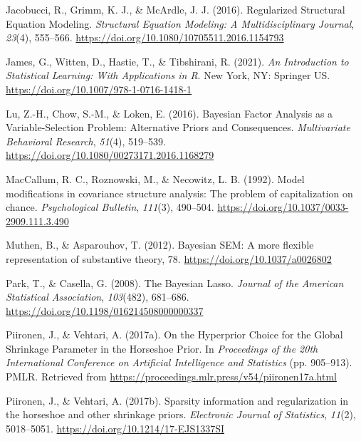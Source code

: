 \documentclass[
  man,floatsintext]{apa6}
\newlength{\cslhangindent}
\newlength{\cslentryspacingunit} %
\newenvironment{CSLReferences}[2] %
 {%
  \setlength{\parindent}{0pt}
  \ifodd #1
  \let\oldpar\par
  \def\par{\hangindent=\cslhangindent\oldpar}
  \fi
  \setlength{\parskip}{#2\cslentryspacingunit}
 }%
 {}
\begin{document}
\begin{CSLReferences}{1}{0}
\leavevmode{}%
Jacobucci, R., Grimm, K. J., \& McArdle, J. J. (2016). Regularized {Structural} {Equation} {Modeling}. \emph{Structural Equation Modeling: A Multidisciplinary Journal}, \emph{23}(4), 555--566. \url{https://doi.org/10.1080/10705511.2016.1154793}

\leavevmode{}%
James, G., Witten, D., Hastie, T., \& Tibshirani, R. (2021). \emph{An {Introduction} to {Statistical} {Learning}: With {Applications} in {R}}. New York, NY: Springer US. \url{https://doi.org/10.1007/978-1-0716-1418-1}

\leavevmode{}%
Lu, Z.-H., Chow, S.-M., \& Loken, E. (2016). Bayesian {Factor} {Analysis} as a {Variable}-{Selection} {Problem}: {Alternative} {Priors} and {Consequences}. \emph{Multivariate Behavioral Research}, \emph{51}(4), 519--539. \url{https://doi.org/10.1080/00273171.2016.1168279}

\leavevmode{}%
MacCallum, R. C., Roznowski, M., \& Necowitz, L. B. (1992). Model modifications in covariance structure analysis: The problem of capitalization on chance. \emph{Psychological Bulletin}, \emph{111}(3), 490--504. \url{https://doi.org/10.1037/0033-2909.111.3.490}

\leavevmode{}%
Muthen, B., \& Asparouhov, T. (2012). Bayesian {SEM}: {A} more ﬂexible representation of substantive theory, 78. \url{https://doi.org/10.1037/a0026802}

\leavevmode{}%
Park, T., \& Casella, G. (2008). The {Bayesian} {Lasso}. \emph{Journal of the American Statistical Association}, \emph{103}(482), 681--686. \url{https://doi.org/10.1198/016214508000000337}

\leavevmode{}%
Piironen, J., \& Vehtari, A. (2017a). On the {Hyperprior} {Choice} for the {Global} {Shrinkage} {Parameter} in the {Horseshoe} {Prior}. In \emph{Proceedings of the 20th {International} {Conference} on {Artificial} {Intelligence} and {Statistics}} (pp. 905--913). PMLR. Retrieved from \url{https://proceedings.mlr.press/v54/piironen17a.html}

\leavevmode{}%
Piironen, J., \& Vehtari, A. (2017b). Sparsity information and regularization in the horseshoe and other shrinkage priors. \emph{Electronic Journal of Statistics}, \emph{11}(2), 5018--5051. \url{https://doi.org/10.1214/17-EJS1337SI}


\end{CSLReferences}
\end{document}
